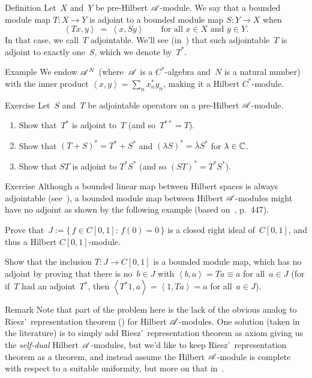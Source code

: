 \documentclass[a]{subfiles}
\begin{document}
\begin{parsec}
\begin{point}{Definition}
Let~$X$ and~$Y$ be pre-Hilbert $\mathscr{A}$-module.
We say that a bounded module map $T\colon X\to Y$
is adjoint to a bounded module map $S\colon Y\to X$
when
\begin{equation*}
\left<Tx,y\right>\ =\ \left<x,Sy\right>
\qquad \text{for all $x\in X$ and $y\in Y$}.
\end{equation*}
In that case, we call~$T$ adjointable.
We'll see (in~\sref{}) that such adjointable~$T$
is adjoint to exactly one~$S$, which we denote by~$T^*$.
\end{point}
\begin{point}{Example}%
We endow $\mathscr{A}^N$
(where~$\mathscr{A}$ is a $C^*$-algebra and~$N$ is a natural number)
with the inner product $\left<x,y\right>=\sum_n x_n^*y_n$,
making it a Hilbert $C^*$-module.
\end{point}
\begin{point}{Exercise}%
Let~$S$ and~$T$ be adjointable operators on a 
pre-Hilbert $\mathscr{A}$-module.
\begin{enumerate}
\item
	Show that~$T^*$ is adjoint to~$T$ (and so~$T^{**}=T$).
\item
Show that $(T+S)^*=T^*+S^*$ 
and $(\lambda S)^*=\overline{\lambda}S^*$ for $\lambda\in \mathbb{C}$.
\item
Show that $ST$ is adjoint to $T^*S^*$
(and so $(ST)^*=T^*S^*$).
\end{enumerate}
\end{point}
\begin{point}{Exercise}%
Although a bounded linear map between Hilbert spaces
is always adjointable (see~),
a bounded module map
between Hilbert $\mathscr{A}$-modules
might have no adjoint
as shown by the following example
(based on~\cite{paschke}, p.~447).

Prove that~$J:=\{\,f\in C[0,1]\colon\, f(0)=0\,\}$
is a closed right ideal of~$C[0,1]$, and thus a
Hilbert $C[0,1]$-module.

Show that the inclusion $T\colon J\to C[0,1]$
is a bounded module map,
which has no adjoint
by proving that there is no~$b\in J$
with $\left<b,a\right>=Ta\equiv a$ for all~$a\in J$
(for if~$T$ had an adjoint~$T^*$,
then $\left<T^*1,a\right>=\left<1,Ta\right>=a$
for all~$a\in J$).

\begin{point}{Remark}%
Note that part of the problem here is the lack 
of the obvious analog to
Riesz'~representation theorem ()  
for Hilbert $\mathscr{A}$-modules.
One solution (taken in the literature) is to simply 
add Riesz'~representation theorem as axiom
giving us the \emph{self-dual} Hilbert $\mathscr{A}$-modules,
but we'd like to keep Riesz'~representation theorem as a theorem,
and instead assume the Hilbert $\mathscr{A}$-module
is complete with respect to a suitable uniformity,
but more on that in~\sref{}.


\end{point}
\end{point}
\end{parsec}
\end{document}

